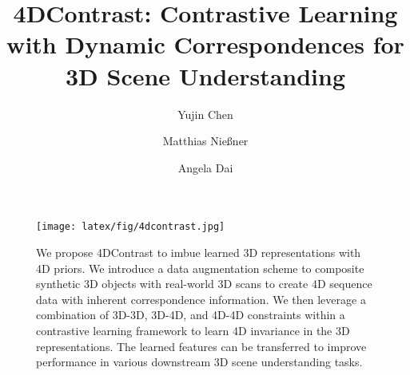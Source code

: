 \documentclass[runningheads]{llncs}
\newcommand{\OURS}{4DContrast}
\begin{document}
\pagestyle{headings}
\mainmatter
\def\ECCVSubNumber{4908}  

\title{\OURS{}: Contrastive Learning with Dynamic Correspondences for 3D Scene Understanding}
\begin{comment}
\titlerunning{ECCV-22 submission ID \ECCVSubNumber} 
\authorrunning{ECCV-22 submission ID \ECCVSubNumber} 
\author{Anonymous ECCV submission}
\institute{Paper ID \ECCVSubNumber}
\end{comment}





\titlerunning{\OURS{}}


\author{Yujin Chen \and Matthias Nießner \and Angela Dai }
\maketitle

\begin{figure}[th!]
   \vspace{-0.5cm}
     \centering
        \texttt{[image: latex/fig/4dcontrast.jpg]}
   \label{fig:teaser}
   \vspace{-0.16in}
       \caption{We propose  \OURS{} to imbue learned 3D representations with 4D priors.
    We introduce a data augmentation scheme to composite synthetic 3D objects with real-world 3D scans to create 4D sequence data with inherent correspondence information.
    We then leverage a combination of 3D-3D, 3D-4D, and 4D-4D constraints within a contrastive learning framework to learn 4D invariance in the 3D representations.
    The learned features can be transferred to improve performance in various downstream 3D scene understanding tasks.}
\end{figure}
\vspace{-1cm}
\end{document}
